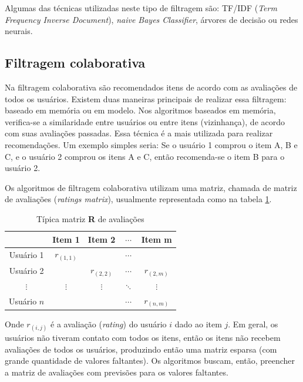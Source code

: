 \documentclass[12pt,a4paper,header]{abnt}
\begin{document}
Algumas das técnicas utilizadas neste tipo de filtragem são: TF/IDF (\textit{Term Frequency Inverse Document}), \textit{naive Bayes Classifier}, árvores de decisão ou redes neurais\cite{isinkaye2015recommendation}. 

\subsection{Filtragem colaborativa}

Na filtragem colaborativa são recomendados itens de acordo com as avaliações de todos os usuários\cite{melville2011recommender}. Existem duas maneiras principais de realizar essa filtragem: baseado em memória ou em modelo\cite{dakhel2011new}. Nos algoritmos baseados em memória, verifica-se a similaridade entre usuários ou entre itens (vizinhança), de acordo com suas avaliações passadas. Essa técnica é a mais utilizada para realizar recomendações\cite{shapira2011recommender}. Um exemplo simples seria: Se o usuário 1 comprou o item A, B e C, e o usuário 2 comprou os itens A e C, então recomenda-se o item B para o usuário 2.

Os algoritmos de filtragem colaborativa utilizam uma matriz, chamada de matriz de avaliações (\textit{ratings matrix}), usualmente representada como na tabela \ref{rating_matrix}.

\begin{table}[h]
\caption{Típica matriz \textbf{R} de avaliações}
\label{rating_matrix}
\centering
\begin{tabular}{@{}c|cccc@{}}
\cmidrule(l){2-5}
\textbf{}   & Item 1       & Item 2       & $\cdots$ & Item m       \\ \midrule
Usuário 1   & $r_{(1, 1)}$ &              & $\cdots$ &              \\
Usuário 2   &              & $r_{(2, 2)}$ & $\cdots$ & $r_{(2, m)}$ \\
$\vdots$    & $\vdots$     & $\vdots$     & $\ddots$ & $\vdots$     \\
Usuário $n$ &              &              & $\cdots$ & $r_{(n, m)}$ \\ \bottomrule
\end{tabular}
\end{table}

Onde $r_{(i, j)}$ é a avaliação (\textit{rating}) do usuário $i$ dado ao item $j$. Em geral, os usuários não tiveram contato com todos os itens, então os itens não recebem avaliações de todos os usuários, produzindo então uma matriz esparsa (com grande quantidade de valores faltantes). Os algoritmos buscam, então, preencher a matriz de avaliações com previsões para os valores faltantes.
\end{document}
